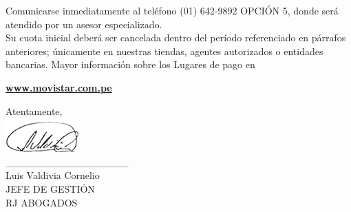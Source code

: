 \noindent Comunicarse inmediatamente al teléfono (01) 642-9892 OPCIÓN 5, donde será atendido por un asesor especializado.\\

\noindent Su cuota inicial deberá ser cancelada dentro del período referenciado en párrafos anteriores; únicamente en nuestras tiendas, agentes autorizados o entidades bancarias. Mayor información sobre los Lugares de pago en
\begin{center}
\underline{\textcolor[rgb]{0.00,0.07,1.00}{\textbf{www.movistar.com.pe}}}
\end{center}

\noindent Atentamente,\\
\includegraphics[natwidth=2.831041667cm, natheight=1.322916667cm]{resources/lawyer_signature.png}\\
\_\_\_\_\_\_\_\_\_\_\_\_\_\_\_\_\_\\
{\small Luis Valdivia Cornelio\\
JEFE DE GESTIÓN\\
RJ ABOGADOS}\\


